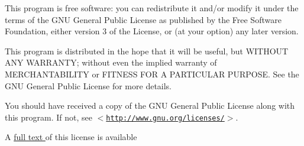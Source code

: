 This program is free software: you can redistribute it and/or modify it under the terms of the GNU General Public License as published by the Free Software Foundation, either version 3 of the License, or (at your option) any later version.

This program is distributed in the hope that it will be useful, but WITHOUT ANY WARRANTY; without even the implied warranty of MERCHANTABILITY or FITNESS FOR A PARTICULAR PURPOSE. See the GNU General Public License for more details.

You should have received a copy of the GNU General Public License along with this program. If not, see $<$\href{http://www.gnu.org/licenses/}{\tt http://www.gnu.org/licenses/}$>$.



A \hyperlink{license}{full text } of this license is available 